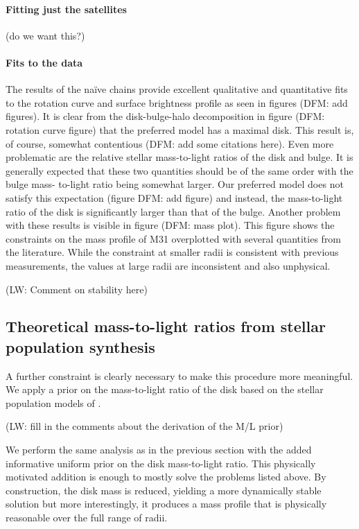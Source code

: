 \documentclass[preprint]{aastex}
\begin{document}
\paragraph{Fitting just the satellites}

(do we want this?)

\paragraph{Fits to the data}

The results of the na\"ive chains provide excellent qualitative and
quantitative fits to the rotation curve and surface brightness profile
as seen in figures (DFM: add figures). It is clear from the disk-bulge-halo
decomposition in figure (DFM: rotation curve figure) that the preferred
model has a maximal disk. This result is, of course, somewhat contentious
(DFM: add some citations here). Even more problematic are the relative
stellar mass-to-light ratios of the disk and bulge. It is generally expected
that these two quantities should be of the same order with the bulge mass-
to-light ratio being somewhat larger. Our preferred model does not satisfy
this expectation (figure DFM: add figure) and instead, the mass-to-light
ratio of the disk is significantly larger than that of the bulge. Another
problem with these results is visible in figure (DFM: mass plot). This
figure shows the constraints on the mass profile of M31 overplotted with
several quantities from the literature. While the constraint at smaller
radii is consistent with previous measurements, the values at large radii
are inconsistent and also unphysical.

(LW: Comment on stability here)


\subsection{Theoretical mass-to-light ratios from stellar population
    synthesis}

A further constraint is clearly necessary to make this procedure more
meaningful. We apply a prior on the mass-to-light ratio of the disk based
on the stellar population models of \citet{Bell:2003}.

(LW: fill in the comments about the derivation of the M/L prior)

We perform the same analysis as in the previous section with the added
informative uniform prior on the disk mass-to-light ratio. This physically
motivated addition is enough to mostly solve the problems listed above. By
construction, the disk mass is reduced, yielding a more dynamically stable
solution but more interestingly, it produces a mass profile that is physically
reasonable over the full range of radii.
\end{document}
